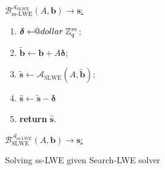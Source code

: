 \documentclass{template}
\makeatletter
\newcommand\leftarrowS{\leftarrow\joinrel\smalldollar}
\newcommand{\smalldollar}{\mathrel{\mathpalette\small@dollar\relax}}
\newcommand{\small@dollar}[2]{%
  \vcenter{\hbox{%
    $#1\textnormal{\fontsize{0.7\dimexpr\f@size pt}{0}\selectfont\$}$%
  }}%
}
\makeatother
\begin{document}
\begin{figure}[ht]
    \centering
    \begin{minipage}{0.3\linewidth}
        \begin{mdframed}[linecolor=black, linewidth=1pt,
                         skipabove=10pt, skipbelow=10pt]
        \colorbox{green!10}{\underline{$\mathcal{B}_{\text{ss-LWE}}^{\mathcal{A}_{\text{SLWE}}}(A,\mathbf{b}) \to \mathbf{s}$:}}
        \begin{enumerate}
            \item $\boldsymbol{\delta} \leftarrowS \mathbb{Z}_q^m$;
            \item $\widetilde{\mathbf{b}} \gets \mathbf{b} + A\boldsymbol{\delta}$;
            \item $\widetilde{\mathbf{s}} \gets \mathcal{A}_{\text{SLWE}}(A,\widetilde{\mathbf{b}})$;
            \item $\widehat{\mathbf{s}} \gets \widetilde{\mathbf{s}} - \boldsymbol{\delta}$
            \item \textbf{return} $\widehat{\mathbf{s}}$.
        \end{enumerate}
        \end{mdframed}
        \caption{Solving ss-LWE given Search-LWE solver} 
        \label{fig:ss-lwe-to-s-lwe}
    \end{minipage}
    \hfill
    \begin{minipage}{0.65\linewidth}
        \begin{mdframed}[linecolor=black, linewidth=1pt,
                         skipabove=10pt, skipbelow=10pt]
        \colorbox{green!10}{\underline{$\mathcal{B}_{\text{SLWE}}^{\mathcal{A}_{\text{ss-LWE}}}(A,\mathbf{b}) \to \mathbf{s}$:}}
\end{mdframed}
\end{minipage}
\end{figure}
\end{document}
